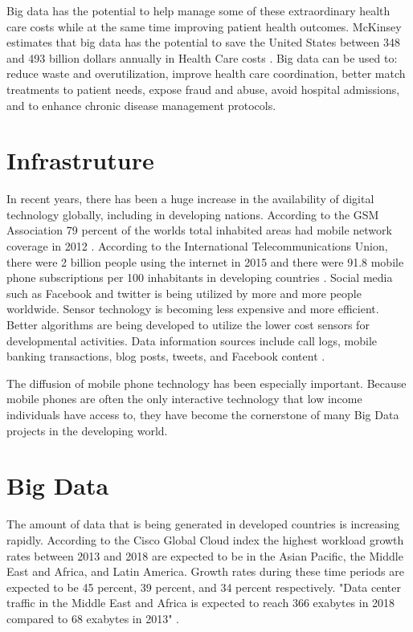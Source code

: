 \documentclass[sigconf]{acmart}
\begin{document}
Big data has the potential to help manage some of these extraordinary health care costs while at the same time improving patient health outcomes. McKinsey estimates that big data has the potential to save the United States between 348 and 493 billion dollars annually in Health Care costs \cite{CIO}. Big data can be used to:  reduce waste and overutilization, improve health care coordination, better match treatments to patient needs, expose fraud and abuse, avoid hospital admissions, and to enhance chronic disease management protocols. 


\section{Infrastruture}
In recent years, there has been a huge increase in the availability of digital technology globally, including in developing nations. According to the GSM Association 79 percent of the worlds total inhabited areas had mobile network coverage in 2012 \cite{DevEcon}. According to the International Telecommunications Union, there were 2 billion people using the internet in 2015 and there were 91.8 mobile phone subscriptions per 100 inhabitants in developing countries \cite{DevEcon}.  Social media such as Facebook and twitter is being utilized by more and more people worldwide. Sensor technology is becoming less expensive and more efficient. Better algorithms are being developed to utilize the lower cost sensors for developmental activities. Data information sources include call logs, mobile banking transactions, blog posts, tweets, and Facebook content \cite{www-google-GloPls}.

The diffusion of mobile phone technology has been especially important.  Because mobile phones are often the only interactive technology that low income individuals have access to, they have become the cornerstone of many Big Data projects in the developing world\cite{DevEcon}.

\section{Big Data}
The amount of data that is being generated in developed countries is increasing rapidly.  According to the Cisco Global Cloud index the highest workload growth rates between 2013 and 2018 are expected to be in the Asian Pacific, the Middle East and Africa, and Latin America.  Growth rates during these time periods are expected to be 45 percent, 39 percent, and 34 percent respectively.  "Data center traffic in the Middle East and Africa is expected to reach 366 exabytes in 2018 compared to 68 exabytes in 2013" \cite{DevEcon}. 
\end{document}
